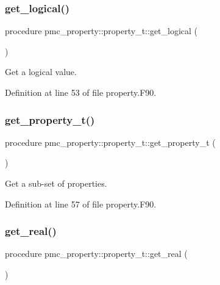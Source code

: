 \subsubsection{\texorpdfstring{get\+\_\+logical()}{get\_logical()}}
{\footnotesize\ttfamily procedure pmc\+\_\+property\+::property\+\_\+t\+::get\+\_\+logical (\begin{DoxyParamCaption}{ }\end{DoxyParamCaption})\hspace{0.3cm}{\ttfamily [private]}}



Get a logical value. 



Definition at line 53 of file property.\+F90.

\mbox{\label{structpmc__property_1_1property__t_a693851f2a291a4aff27884964b4ff527}} 
\subsubsection{\texorpdfstring{get\+\_\+property\+\_\+t()}{get\_property\_t()}}
{\footnotesize\ttfamily procedure pmc\+\_\+property\+::property\+\_\+t\+::get\+\_\+property\+\_\+t (\begin{DoxyParamCaption}{ }\end{DoxyParamCaption})\hspace{0.3cm}{\ttfamily [private]}}



Get a sub-\/set of properties. 



Definition at line 57 of file property.\+F90.

\mbox{\label{structpmc__property_1_1property__t_ab3da34666ee533c3d9f15e1af01af91c}} 
\subsubsection{\texorpdfstring{get\+\_\+real()}{get\_real()}}
{\footnotesize\ttfamily procedure pmc\+\_\+property\+::property\+\_\+t\+::get\+\_\+real (\begin{DoxyParamCaption}{ }\end{DoxyParamCaption})\hspace{0.3cm}{\ttfamily [private]}}



